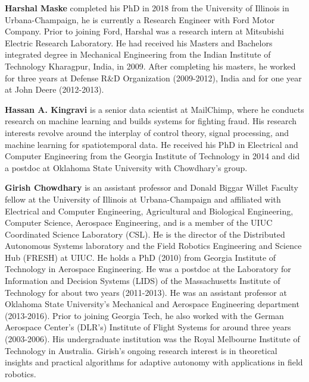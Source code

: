 \documentclass[letterpaper,12pt,peerreviewca,draftcls]{IEEEtran}
\begin{document}
\noindent \textbf{Harshal Maske} completed his PhD in 2018 from the University of Illinois in Urbana-Champaign, he is currently a Research Engineer with Ford Motor Company. Prior to joining Ford, Harshal was a research intern at Mitsubishi Electric Research Laboratory. He had received his Masters and Bachelors integrated degree in Mechanical Engineering from the Indian Institute of Technology Kharagpur, India, in 2009. After completing his masters, he worked for three years at Defense R\&D Organization (2009-2012), India and for one year at John Deere (2012-2013). 

\noindent \textbf{Hassan A. Kingravi}  is a senior data scientist at MailChimp, where he conducts research on machine learning and builds systems for fighting fraud. His research interests revolve around the interplay of control theory, signal processing, and machine learning for spatiotemporal data. He received his PhD in Electrical and Computer Engineering from the Georgia Institute of Technology in 2014 and did a postdoc at Oklahoma State University with Chowdhary's group.

\noindent \textbf{Girish Chowdhary} is an assistant professor and Donald Biggar Willet Faculty fellow at the University of Illinois at Urbana-Champaign and affiliated with Electrical and Computer Engineering, Agricultural and Biological Engineering, Computer Science, Aerospace Engineering, and is a member of the UIUC Coordinated Science Laboratory (CSL). He is the director of the Distributed Autonomous Systems laboratory and the Field Robotics Engineering and Science Hub (FRESH) at UIUC. He holds a PhD (2010) from Georgia Institute of Technology in Aerospace Engineering. He was a postdoc at the Laboratory for Information and Decision Systems (LIDS) of the Massachusetts Institute of Technology for about two years (2011-2013). He was an assistant professor at Oklahoma State University's Mechanical and Aerospace Engineering department (2013-2016). Prior to joining Georgia Tech, he also worked with the German Aerospace Center's (DLR's) Institute of Flight Systems for around three years (2003-2006). His undergraduate institution was the Royal Melbourne Institute of Technology in Australia. Girish's ongoing research interest is in theoretical insights and practical algorithms for adaptive autonomy with applications in field robotics.  
\end{document}
